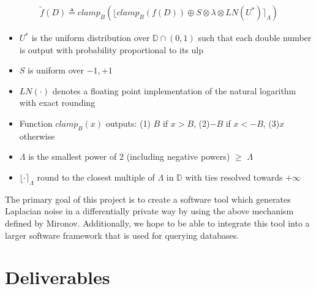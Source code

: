 \documentclass[11pt]{exam}
\begin{document}
\begin{align}
    \tilde{f}(D) \triangleq clamp_{B}(\lfloor clamp_{B}(f(D)) \oplus S \otimes \lambda \otimes LN(U^{*})  \rceil_{\Lambda}) 
\end{align}
\begin{itemize}
    \item $U^{*}$ is the uniform distribution over $\mathbb{D} \cap(0,1)$ such that each double number is output with probability proportional to its ulp
    \item $S$ is uniform over ${-1,+1}$
    \item $LN(\cdot)$ denotes a floating point implementation of the natural logarithm with exact rounding 
    \item Function $clamp_{B}(x)$ outputs: (1) $B$ if $x>B$, (2)$-B$ if $x<-B$, (3)$x$ otherwise
    \item $\Lambda$ is the smallest power of 2 (including negative powers) $\geq$ $\Lambda$ 
    \item $\lfloor \cdot \rceil_{\Lambda}$ round to the closest multiple of $\Lambda$ in $\mathbb{D}$ with ties resolved towards $+\infty$
\end{itemize}

The primary goal of this project is to create a software tool which generates Laplacian noise in a differentially private way by using the above mechanism defined by Mironov.  Additionally, we hope to be able to integrate this tool into a larger software framework that is used for querying databases.

\section{Deliverables}
\end{document}
